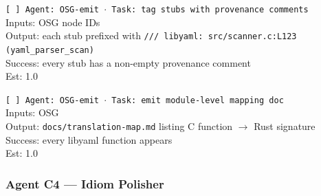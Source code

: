 \documentclass[12pt]{article}
\theoremstyle{definition}
\theoremstyle{remark}
\begin{document}
\begin{small}
\noindent\texttt{[ ] Agent: OSG-emit $\cdot$ Task: tag stubs with provenance comments}\\
\hspace*{2em}Inputs: OSG node IDs\\
\hspace*{2em}Output: each stub prefixed with \texttt{/// libyaml: src/scanner.c:L123 (yaml\_parser\_scan)}\\
\hspace*{2em}Success: every stub has a non-empty provenance comment\\
\hspace*{2em}Est: 1.0

\noindent\texttt{[ ] Agent: OSG-emit $\cdot$ Task: emit module-level mapping doc}\\
\hspace*{2em}Inputs: OSG\\
\hspace*{2em}Output: \texttt{docs/translation-map.md} listing C function $\to$ Rust signature\\
\hspace*{2em}Success: every libyaml function appears\\
\hspace*{2em}Est: 1.0
\end{small}

\subsubsection{Agent C4 --- Idiom Polisher}
\end{document}
